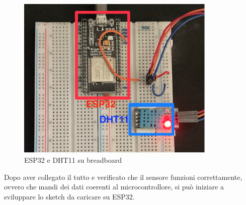 \begin{figure}[H]
    \begin{center}
        \includegraphics[width=0.85\textwidth]{img/esp32dht11}
    \end{center}
    \label{esp32dht11}
    \caption{ESP32 e DHT11 su breadboard}
\end{figure}
Dopo aver collegato il tutto e verificato che il sensore funzioni correttamente, ovvero che mandi dei dati
coerenti al microcontrollore, si può iniziare a sviluppare lo sketch da caricare su ESP32.

